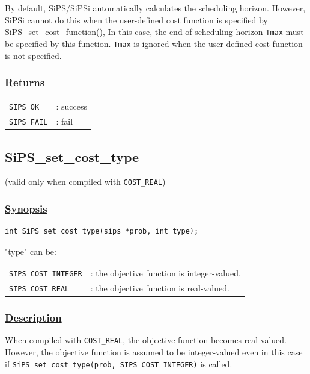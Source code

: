 \documentclass[a4paper]{book}
\begin{document}
By default, SiPS/SiPSi automatically calculates the scheduling horizon.
However, SiPSi cannot do this when the user-defined cost function is specified by \hyperlink{SiPS_set_cost_function}{SiPS\_set\_cost\_function()}, In this case, the end of scheduling horizon \verb+Tmax+ must be specified by this function.
\verb+Tmax+ is ignored when the user-defined cost function is not specified.

\subsubsection{\underline{Returns}}

\begin{tabular}{ll}
  \verb+SIPS_OK+  &: success\\
  \verb+SIPS_FAIL+&: fail\\
\end{tabular}

\hypertarget{SiPS_set_cost_type}{%
\subsection{SiPS\_set\_cost\_type}
}

(valid only when compiled with \verb+COST_REAL+)

\subsubsection{\underline{Synopsis}}

\begin{verbatim}
int SiPS_set_cost_type(sips *prob, int type);
\end{verbatim}

\noindent
"type" can be:\\
%
\begin{tabular}[t]{ll}
  \verb+SIPS_COST_INTEGER+ &: the objective function is integer-valued.\\
  \verb+SIPS_COST_REAL+    &: the objective function is real-valued.\\
\end{tabular}

\subsubsection{\underline{Description}}

When compiled with \verb+COST_REAL+, the objective function becomes real-valued.
However, the objective function is assumed to be integer-valued even in this case if \verb+SiPS_set_cost_type(prob, SIPS_COST_INTEGER)+ is called.
\end{document}
